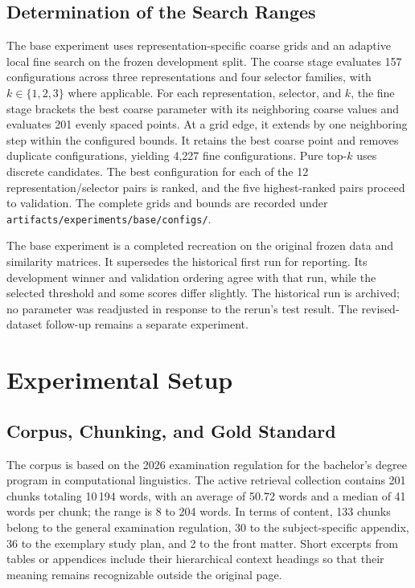 \documentclass[11pt]{article}
\begin{document}
\subsection{Determination of the Search Ranges}

The base experiment uses representation-specific coarse grids and an adaptive local fine search on the frozen development split. The coarse stage evaluates 157 configurations across three representations and four selector families, with $k\in\{1,2,3\}$ where applicable. For each representation, selector, and $k$, the fine stage brackets the best coarse parameter with its neighboring coarse values and evaluates 201 evenly spaced points. At a grid edge, it extends by one neighboring step within the configured bounds. It retains the best coarse point and removes duplicate configurations, yielding 4,227 fine configurations. Pure top-$k$ uses discrete candidates. The best configuration for each of the 12 representation/selector pairs is ranked, and the five highest-ranked pairs proceed to validation. The complete grids and bounds are recorded under \nolinkurl{artifacts/experiments/base/configs/}.

The base experiment is a completed recreation on the original frozen data and similarity matrices. It supersedes the historical first run for reporting. Its development winner and validation ordering agree with that run, while the selected threshold and some scores differ slightly. The historical run is archived; no parameter was readjusted in response to the rerun's test result. The revised-dataset follow-up remains a separate experiment.

\section{Experimental Setup}

\subsection{Corpus, Chunking, and Gold Standard}

The corpus is based on the 2026 examination regulation for the bachelor's degree program in computational linguistics. The active retrieval collection contains 201 chunks totaling 10{\,}194 words, with an average of 50.72 words and a median of 41 words per chunk; the range is 8 to 204 words. In terms of content, 133 chunks belong to the general examination regulation, 30 to the subject-specific appendix, 36 to the exemplary study plan, and 2 to the front matter. Short excerpts from tables or appendices include their hierarchical context headings so that their meaning remains recognizable outside the original page.
\end{document}
